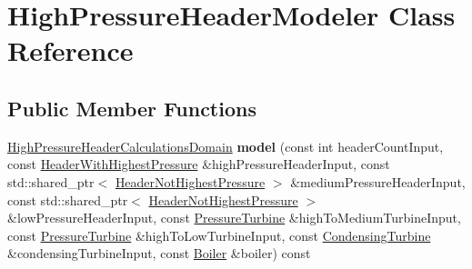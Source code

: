 \hypertarget{class_high_pressure_header_modeler}{}\section{High\+Pressure\+Header\+Modeler Class Reference}
\label{class_high_pressure_header_modeler}
\subsection*{Public Member Functions}
\begin{DoxyCompactItemize}
\item 
\mbox{\label{class_high_pressure_header_modeler_a2ada0d9d67ef16c0256f5ee52358167d}} 
\hyperlink{class_high_pressure_header_calculations_domain}{High\+Pressure\+Header\+Calculations\+Domain} {\bfseries model} (const int header\+Count\+Input, const \hyperlink{class_header_with_highest_pressure}{Header\+With\+Highest\+Pressure} \&high\+Pressure\+Header\+Input, const std\+::shared\+\_\+ptr$<$ \hyperlink{class_header_not_highest_pressure}{Header\+Not\+Highest\+Pressure} $>$ \&medium\+Pressure\+Header\+Input, const std\+::shared\+\_\+ptr$<$ \hyperlink{class_header_not_highest_pressure}{Header\+Not\+Highest\+Pressure} $>$ \&low\+Pressure\+Header\+Input, const \hyperlink{class_pressure_turbine}{Pressure\+Turbine} \&high\+To\+Medium\+Turbine\+Input, const \hyperlink{class_pressure_turbine}{Pressure\+Turbine} \&high\+To\+Low\+Turbine\+Input, const \hyperlink{class_condensing_turbine}{Condensing\+Turbine} \&condensing\+Turbine\+Input, const \hyperlink{class_boiler}{Boiler} \&boiler) const
\item 
\mbox{\label{class_high_pressure_header_modeler_a6a24f4385ad44c16b27bb99ab17372e1}} 

\end{DoxyCompactItemize}

